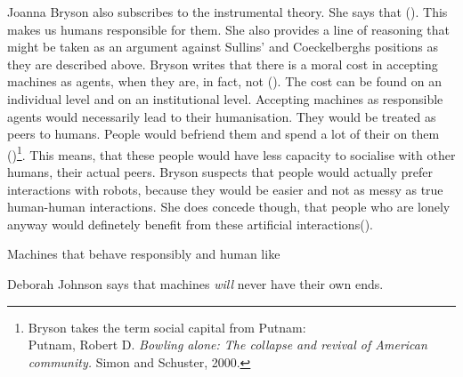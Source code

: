 \documentclass{article}
\begin{document}
Joanna Bryson also subscribes to the instrumental theory. She says that
(\cite[p. 3]{bryson2010robots}). This makes us humans
responsible for them. She also provides a line of reasoning that
might be taken as an argument against Sullins' and Coeckelberghs positions as
they are described above. Bryson writes that there is a moral cost in accepting
machines as agents, when they are, in fact, not (\cite[p. 2]{bryson2010robots}).
The cost can be found on an individual level and on an institutional level.
Accepting machines as responsible agents would necessarily lead to their
humanisation. They would be treated as peers to humans. People would befriend them and
spend a lot of their  on them (\cite[p.
5]{bryson2010robots})\footnote{Bryson takes the term social capital from
	Putnam:\\
Putnam, Robert D. \textit{Bowling alone: The collapse and revival of American
community.} Simon and Schuster, 2000.}. 
This means, that these people would have less capacity to socialise with other
humans, their actual peers. Bryson suspects that people would actually prefer
interactions with robots, because they would be easier and not as messy as true
human-human interactions. She does concede though, that people who are lonely
anyway would definetely benefit from these artificial interactions(\cite[p.
5]{bryson2010robots}). 


Machines that behave responsibly and human like 

Deborah Johnson says that machines \textit{will} never have their own ends.
\end{document}
